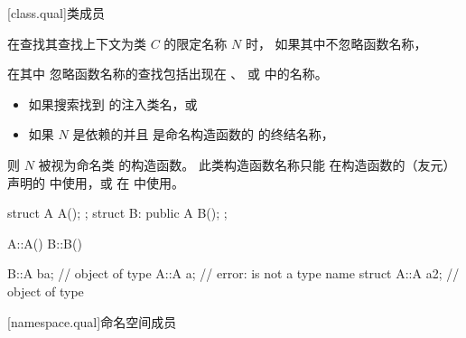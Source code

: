 [class.qual]{类成员}

%

\pnum
在查找其查找上下文为类 $C$ 的限定名称 $N$ 时，
如果其中不忽略函数名称，
\begin{footnote}
在其中
忽略函数名称的查找包括出现在
、
 或  中的名称。
\end{footnote}
\begin{itemize}
\item
如果搜索找到  的注入类名，或
\item
如果 $N$ 是依赖的并且
是命名构造函数的 
的终结名称，
\end{itemize}
则 $N$ 被视为命名类  的构造函数。
此类构造函数名称只能
在构造函数的（友元）声明的  中使用，或
在  中使用。
\begin{example}
\begin{codeblock}
struct A { A(); };
struct B: public A { B(); };

A::A() { }
B::B() { }

B::A ba;            // object of type 
A::A a;             // error:  is not a type name
struct A::A a2;     // object of type 
\end{codeblock}
\end{example}

[namespace.qual]{命名空间成员}

